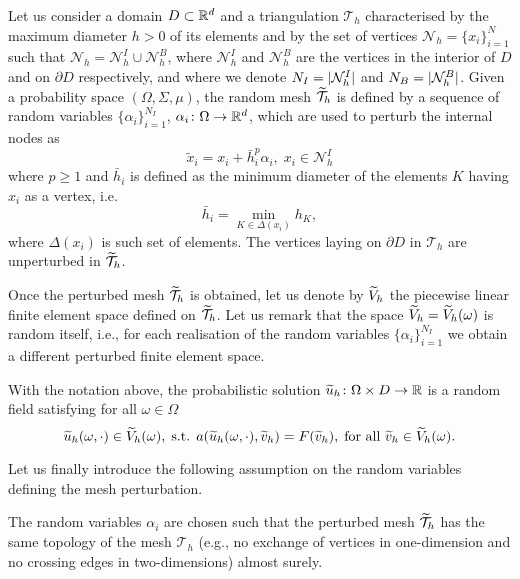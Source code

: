 \documentclass[10pt]{article}
\begin{document}
\begin{definition} \label{def:RandomMesh} Let us consider a domain $D \subset \mathbb{R}^d$ and a triangulation $\mathcal T_h$ characterised by the maximum diameter $h > 0$ of its elements and by the set of vertices $\mathcal N_h = \{x_i\}_{i=1}^{N}$ such that $\mathcal N_h = \mathcal N_h^I \cup \mathcal N_h^B$, where $\mathcal N_h^I$ and $\mathcal N_h^B$ are the vertices in the interior of $D$ and on $\partial D$ respectively, and where we denote $N_I = \lvert\mathcal N_h^I\rvert$ and $N_B = \lvert\mathcal N_h^B\rvert$. Given a probability space $(\Omega, \Sigma, \mu)$, the random mesh $\widetilde {\mathcal T}_h$ is defined by a sequence of random variables $\{\alpha_i\}_{i=1}^{N_I}$, $\alpha_i \colon \Omega \to \mathbb{R}^d$, which are used to perturb the internal nodes as
	\begin{equation}
	\tilde x_i = x_i + \bar h_i^p \alpha_i, \; x_i \in \mathcal N_h^I
	\end{equation}
	where $p \geq 1$ and $\bar h_i$ is defined as the minimum diameter of the elements $K$ having $x_i$ as a vertex, i.e.
	\begin{equation}
	\bar h_i = \min_{K \in \Delta(x_i)} h_K,
	\end{equation}
	where $\Delta(x_i)$ is such set of elements. The vertices laying on $\partial D$ in $\mathcal T_h$ are unperturbed in $\widetilde {\mathcal T}_h$.
\end{definition}

Once the perturbed mesh $\widetilde {\mathcal T}_h$ is obtained, let us denote by $\widetilde V_h$ the piecewise linear finite element space defined on $\widetilde {\mathcal T}_h$. Let us remark that the space $\widetilde V_h = \widetilde V_h(\omega)$ is random itself, i.e., for each realisation of the random variables $\{\alpha_i\}_{i=1}^{N_I}$ we obtain a different perturbed finite element space.


\begin{definition} \label{def:ProbSolution} With the notation above, the probabilistic solution $\widetilde u_h \colon \Omega \times D \to \mathbb{R}$ is a random field satisfying for all $\omega \in \Omega$
	\begin{equation}
		\widetilde u_h(\omega, \cdot) \in \widetilde V_h(\omega), \; \text{s.t. } a(\widetilde u_h(\omega, \cdot), \widetilde v_h) = F(\widetilde v_h), \; \text{for all } \widetilde v_h \in \widetilde V_h(\omega). 
	\end{equation}
\end{definition}

Let us finally introduce the following assumption on the random variables defining the mesh perturbation. 
\begin{assumption} \label{as:MeshPerturbation}  The random variables $\alpha_i$ are chosen such that the perturbed mesh $\widetilde {\mathcal T}_h$ has the same topology of the mesh $\mathcal T_h$ (e.g., no exchange of vertices in one-dimension and no crossing edges in two-dimensions) almost surely.  
\end{assumption}
\end{document}
